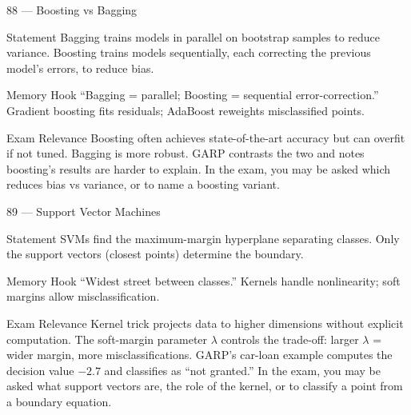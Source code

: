 \documentclass[aspectratio=169,8pt]{beamer}
\begin{document}
	\begin{frame}{88 --- Boosting vs Bagging}
		\begin{block}{Statement}
			Bagging trains models in parallel on bootstrap samples to reduce variance. Boosting trains models sequentially, each correcting the previous model's errors, to reduce bias.
		\end{block}
		\begin{block}{Memory Hook}
			``Bagging = parallel; Boosting = sequential error-correction.'' Gradient boosting fits residuals; AdaBoost reweights misclassified points.
		\end{block}
		\begin{block}{Exam Relevance}
			Boosting often achieves state-of-the-art accuracy but can overfit if not tuned. Bagging is more robust. GARP contrasts the two and notes boosting's results are harder to explain. In the exam, you may be asked which reduces bias vs variance, or to name a boosting variant.
		\end{block}
	\end{frame}
	
	\begin{frame}{89 --- Support Vector Machines}
		\begin{block}{Statement}
			SVMs find the maximum-margin hyperplane separating classes. Only the support vectors (closest points) determine the boundary.
		\end{block}
		\begin{block}{Memory Hook}
			``Widest street between classes.'' Kernels handle nonlinearity; soft margins allow misclassification.
		\end{block}
		\begin{block}{Exam Relevance}
			Kernel trick projects data to higher dimensions without explicit computation. The soft-margin parameter $\lambda$ controls the trade-off: larger $\lambda$ = wider margin, more misclassifications. GARP's car-loan example computes the decision value $-2.7$ and classifies as ``not granted.'' In the exam, you may be asked what support vectors are, the role of the kernel, or to classify a point from a boundary equation.
		\end{block}
	\end{frame}
	
\end{document}
